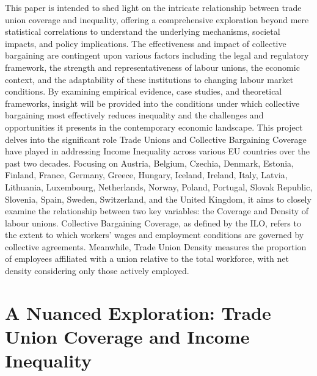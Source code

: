 \documentclass{article}
\begin{document}
This paper is intended to shed light on the intricate relationship between trade union coverage and inequality, offering a comprehensive exploration beyond mere statistical correlations to understand the underlying mechanisms, societal impacts, and policy implications. The effectiveness and impact of collective bargaining are contingent upon various factors including the legal and regulatory framework, the strength and representativeness of labour unions, the economic context, and the adaptability of these institutions to changing labour market conditions. By examining empirical evidence, case studies, and theoretical frameworks, insight will be provided into the conditions under which collective bargaining most effectively reduces inequality and the challenges and opportunities it presents in the contemporary economic landscape. This project delves into the significant role Trade Unions and Collective Bargaining Coverage have played in addressing Income Inequality across various EU countries over the past two decades. Focusing on Austria, Belgium, Czechia, Denmark, Estonia, Finland, France, Germany, Greece, Hungary, Iceland, Ireland, Italy, Latvia, Lithuania, Luxembourg, Netherlands, Norway, Poland, Portugal, Slovak Republic, Slovenia, Spain, Sweden, Switzerland, and the United Kingdom, it aims to closely examine the relationship between two key variables: the Coverage and Density of labour unions. Collective Bargaining Coverage, as defined by the ILO, refers to the extent to which workers' wages and employment conditions are governed by collective agreements. Meanwhile, Trade Union Density measures the proportion of employees affiliated with a union relative to the total workforce, with net density considering only those actively employed.  

\newpage

\section{A Nuanced Exploration: Trade Union Coverage and Income Inequality}
\end{document}
